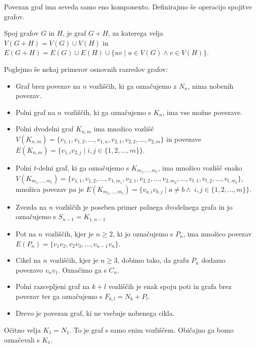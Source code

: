\documentclass[mat1, tisk]{fmfdelo}
\newcommand{\1}{(1, 1, \ldots, 1)}
\newcommand{\2}{(2, 2, \ldots, 2)}
\begin{document}
Povezan graf ima seveda samo eno komponento. Definirajmo še operacijo spojitve grafov.

\begin{definicija} \label{def:spoj}
    Spoj grafov $G$ in $H$, je graf $G + H$, za katerega velja $V(G + H) = V(G) \cup V(H)$ 
    in $E(G + H)  = E(G) \cup E(H) \cup \{ uv \;  | \;  u \in V(G) \land v \in V(H) \}.$
\end{definicija}

Poglejmo še nekaj primerov osnovnih razredov grafov:
\begin{itemize} \label{razredi_grafov}
    \item Graf brez povezav na $n$ vozliščih, ki ga označujemo z $N_n$, nima nobenih povezav. 
    \item Polni graf na $n$ vozliščih, ki ga označujemo s $K_n$, ima vse možne povezave.
    \item Polni dvodelni graf $K_{n, m}$ ima množico 
    vozlišč $V(K_{n,m}) = \{ v_{1, 1}, v_{1, 2}, \ldots , v_{1, n},  \allowbreak v_{2, 1}, v_{2, 2}, \ldots , v_{2, m} \}$
    in povezave $E(K_{n, m}) = \{ v_{1, i} v_{2, j} \; | \; i, j \in \{ 1, 2, \ldots , m \} \}.$ 
    \item  Polni $t$-delni graf, ki ga označujemo s $K_{m_1, \ldots, m_t}$, ima množico 
    vozlišč enako $V(K_{m_1, \ldots, m_t}) = \{ v_{1, 1}, v_{1, 2}, \ldots , v_{1, m_1}, 
     v_{2, 1}, v_{2, 2}, \ldots , v_{2, m_2}, \ldots , v_{t, 1}, v_{t, 2}, \ldots , v_{t, m_t}\}$,
    množica povezav pa je $E(K_{m_1, \ldots, m_t}) = \{  v_{a, i} v_{b, j} \; | \; a \neq b \land \; 
    i, j \in \{ 1, 2, \ldots , m \} \}.$
    \item Zvezda na $n$ vozliščih je poseben primer polnega dvodelnega grafa in jo označujemo
    s $S_{n-1} = K_{1, n-1}$
    \item Pot na $n$ vozliščih, kjer je $n \geq 2$, ki jo označujemo s $P_n$, ima množico povezav 
    $E(P_n) = \{ v_1 v_2 , v_2 v_3 , \ldots , v_{n-1} v_n\}.$
    \item Cikel na $n$ vozliščih, kjer je $n \geq 3$, dobimo tako, da grafu $P_n$ dodamo povezavo $v_n v_1$. 
    Označimo ga s $C_n$.
    \item Polni razcepljeni graf na $k+l$ vozliščih je enak spoju poti in grafa brez povezav ter ga 
    označujemo s $F_{k,l} = N_k + P_l.$
    \item Drevo je povezan graf, ki ne vsebuje nobenega cikla.
\end{itemize}

\begin{opomba}
    Očitno velja $K_1 = N_1.$ To je graf s samo enim vozliščem. Običajno ga bomo
    označevali s $K_1.$
\end{opomba}
\end{document}
